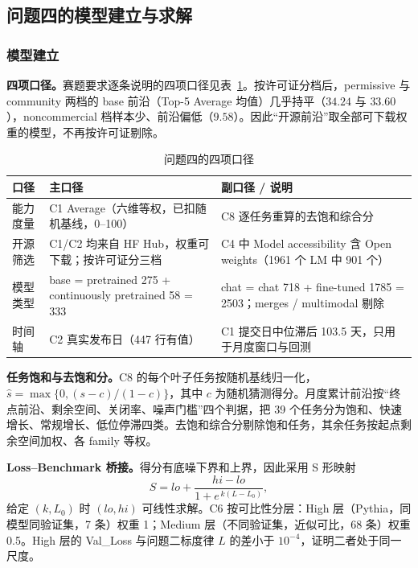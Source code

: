 \subsection{问题四的模型建立与求解}

\subsubsection{模型建立}

\textbf{四项口径。}赛题要求逐条说明的四项口径见表~\ref{tab:q4kou}。按许可证分档后，permissive 与 community 两档的 base 前沿（Top-5 Average 均值）几乎持平（$34.24$ 与 $33.60$），noncommercial 档样本少、前沿偏低（$9.58$）。因此“开源前沿”取全部可下载权重的模型，不再按许可证剔除。

\begin{table}[H]
\centering\small
\caption{问题四的四项口径}
\label{tab:q4kou}
\begin{tabular}{p{1.9cm}p{6.4cm}p{6.1cm}}
\toprule
口径 & 主口径 & 副口径 / 说明 \\
\midrule
能力度量 & C1 Average（六维等权，已扣随机基线，0–100） & C8 逐任务重算的去饱和综合分 \\
开源筛选 & C1/C2 均来自 HF Hub，权重可下载；按许可证分三档 & C4 中 Model accessibility 含 Open weights（1961 个 LM 中 901 个） \\
模型类型 & base = pretrained 275 + continuously pretrained 58 = 333 & chat = chat 718 + fine-tuned 1785 = 2503；merges / multimodal 剔除 \\
时间轴 & C2 真实发布日（447 行有值） & C1 提交日中位滞后 103.5 天，只用于月度窗口与回测 \\
\bottomrule
\end{tabular}
\end{table}

\textbf{任务饱和与去饱和分。}C8 的每个叶子任务按随机基线归一化，$\hat s=\max\{0,(s-c)/(1-c)\}$，其中 $c$ 为随机猜测得分。月度累计前沿按“终点前沿、剩余空间、关闭率、噪声门槛”四个判据，把 39 个任务分为饱和、快速增长、常规增长、低位停滞四类。去饱和综合分剔除饱和任务，其余任务按起点剩余空间加权、各 family 等权。

\textbf{Loss–Benchmark 桥接。}得分有底噪下界和上界，因此采用 S 形映射
\begin{equation}
S=lo+\frac{hi-lo}{1+e^{\,k(L-L_0)}} ,
\label{eq:bridge}
\end{equation}
给定 $(k,L_0)$ 时 $(lo,hi)$ 可线性求解。C6 按可比性分层：High 层（Pythia，同模型同验证集，7 条）权重 1；Medium 层（不同验证集，近似可比，68 条）权重 0.5。High 层的 Val\_Loss 与问题二标度律 $\hat L$ 的差小于 $10^{-4}$，证明二者处于同一尺度。

